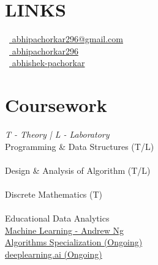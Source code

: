 \documentclass[]{deedy-resume-openfont}
\begin{document}
\begin{minipage}[t]{0.33\textwidth}

\section{LINKS} 
\faEnvelope\ {\href{mailto:abhipachorkar296@gmail.com}{ abhipachorkar296@gmail.com}}\\
\faGithub\ {\href{https://github.com/abhipachorkar296}{ abhipachorkar296}}\\
\faLinkedinSquare\ {\href{https://www.linkedin.com/in/abhishek-pachorkar}{ abhishek-pachorkar}}\\


\sectionsep


\section{Coursework}
\emph{T - Theory | L - Laboratory}\\
Programming \& Data Structures (T/L)\\~\\
Design \& Analysis of Algorithm (T/L) \\~\\
Discrete Mathematics (T) \\~\\
Educational Data Analytics \\
\href{https://www.coursera.org/learn/machine-learning}{Machine Learning - Andrew Ng}\\
\href{https://www.coursera.org/specializations/algorithms?}{Algorithms Specialization (Ongoing)}\\
\href{https://www.coursera.org/specializations/deep-learning}{deeplearning.ai (Ongoing)}

\sectionsep



%
%

\end{minipage} 
\hfill
\end{document}
